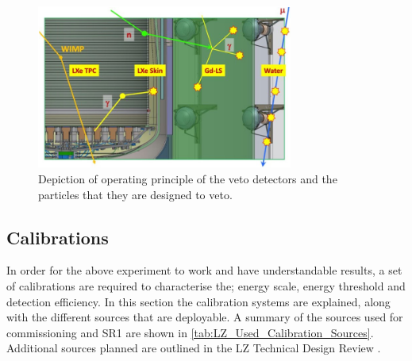 \begin{figure}
    \centering
    \includegraphics[width=0.75\textwidth]{Figures/LZ/lz_veto_plan.png}
    \caption{Depiction of operating principle of the veto detectors and the particles that they are designed to veto.}
    \label{fig:LZ_Veto_Principle}
\end{figure}


\subsection{Calibrations}
\label{sec:lz_calibrations}
\par
In order for the above experiment to work and have understandable results, a set of calibrations are required to characterise the; energy scale, energy threshold and detection efficiency.
In this section the calibration systems are explained, along with the different sources that are deployable.
A summary of the sources used for commissioning and SR1 are shown in \autoref{tab:LZ_Used_Calibration_Sources}.
Additional sources planned are outlined in the LZ Technical Design Review \cite{LZ_TechnicalDesignReview_ref}.

